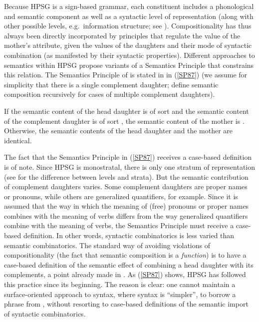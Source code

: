 \documentclass[output=paper
 	        ,biblatex
                ,babelshorthands
                ,newtxmath
                ,draftmode
                ,colorlinks, citecolor=brown
]{langscibook}
\begin{document}
Because HPSG is a sign-based grammar, each constituent includes a phonological and semantic component as well as a syntactic level of representation (along with other possible levels, e.g.\ information structure; see ). Compositionality has thus always been directly incorporated by principles that regulate the value of the mother's  attribute, given the  values of the daughters and their mode of syntactic combination (as manifested by their syntactic properties). Different approaches to semantics within HPSG  propose variants of a Semantics Principle that constrains this relation. The Semantics Principle of \citet[109]{PollardandSag1987} is stated in  in (\ref{SP87}) (we assume for simplicity that there is a single complement daughter; \citeauthor{PollardandSag1987} define semantic composition recursively for cases of multiple complement daughters).

\eal \label{SP87}
\ex
If the semantic content  of the head daughter is of sort  and the semantic content  of the complement daughter is of sort , the semantic content of the mother is .\\
\ex Otherwise, the semantic contents of the head daughter and the mother are identical.
\zl


The fact that the Semantics Principle in (\ref{SP87}) receives a case-based definition is of note. Since HPSG is monostratal, there is only one stratum of representation (see \citealt{Ladusaw1988b} for the difference between levels and strata). But the semantic contribution of complement daughters varies. Some complement daughters are proper names or pronouns, while others are generalized quantifiers, for example. Since it is assumed that the way in which the meaning of (free) pronouns or proper names combines with the meaning of verbs  differs from the way generalized quantifiers combine with the meaning of verbs, the Semantics Principle must receive a case-based definition. In other words, syntactic combinatorics is less varied than semantic combinatorics. The standard way of avoiding violations of compositionality (the fact that semantic composition is a \emph{function}) is to have a case-based definition of the semantic effect of combining a head daughter with its complements, a point already made in \citet{Partee1984a}. As (\ref{SP87}) shows, HPSG has followed this practice since its beginning. The reason is clear: one cannot maintain a surface-oriented approach to syntax, where syntax is ``simpler'', to borrow a phrase from \citet{CulicoverandJackendoff2005}, without resorting to case-based definitions of the semantic import of syntactic combinatorics.
\end{document}
